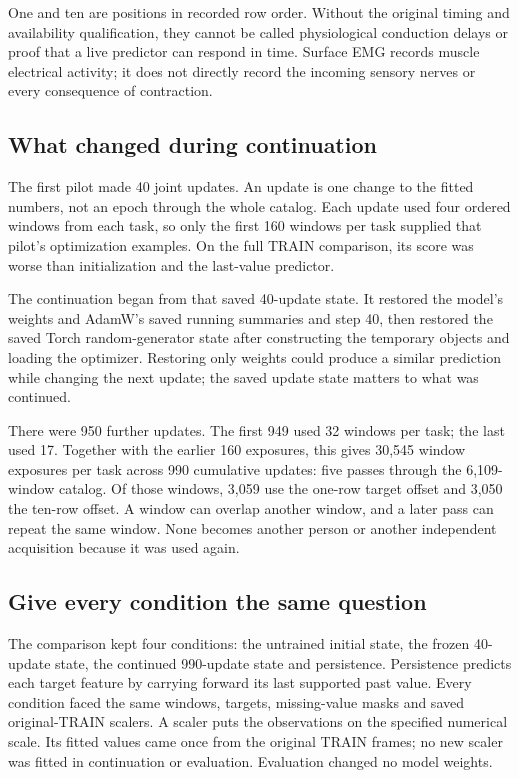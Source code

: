 One and ten are positions in recorded row order. Without the original timing and availability qualification, they cannot be called physiological conduction delays or proof that a live predictor can respond in time. Surface EMG records muscle electrical activity; it does not directly record the incoming sensory nerves or every consequence of contraction.

\subsection{What changed during continuation}
The first pilot made 40 joint updates. An update is one change to the fitted numbers, not an epoch through the whole catalog. Each update used four ordered windows from each task, so only the first 160 windows per task supplied that pilot's optimization examples. On the full TRAIN comparison, its score was worse than initialization and the last-value predictor.

The continuation began from that saved 40-update state. It restored the model's weights and AdamW's saved running summaries and step 40, then restored the saved Torch random-generator state after constructing the temporary objects and loading the optimizer. Restoring only weights could produce a similar prediction while changing the next update; the saved update state matters to what was continued.

There were 950 further updates. The first 949 used 32 windows per task; the last used 17. Together with the earlier 160 exposures, this gives 30,545 window exposures per task across 990 cumulative updates: five passes through the 6,109-window catalog. Of those windows, 3,059 use the one-row target offset and 3,050 the ten-row offset. A window can overlap another window, and a later pass can repeat the same window. None becomes another person or another independent acquisition because it was used again.

\subsection{Give every condition the same question}
The comparison kept four conditions: the untrained initial state, the frozen 40-update state, the continued 990-update state and persistence. Persistence predicts each target feature by carrying forward its last supported past value. Every condition faced the same windows, targets, missing-value masks and saved original-TRAIN scalers. A scaler puts the observations on the specified numerical scale. Its fitted values came once from the original TRAIN frames; no new scaler was fitted in continuation or evaluation. Evaluation changed no model weights.

